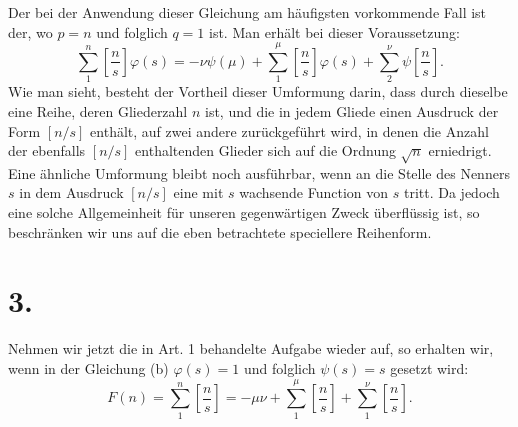 \documentclass[11pt]{article}
\newcommand{\floor}[1]{\left[#1\right]}
\begin{document}
Der bei der Anwendung dieser Gleichung am häufigsten vorkommende Fall ist der, wo $p=n$ und folglich $q=1$ ist. Man erhält bei dieser Voraussetzung:
\begin{equation}
 \sum_{1}^{n}\floor{\frac ns}\varphi(s)=
 -\nu\psi(\mu)+\sum_{1}^{\mu}\floor{\frac ns}\varphi(s)+
 \sum_{2}^{\nu}\psi\floor{\frac ns}. \tag{b}
\end{equation}
Wie man sieht, besteht der Vortheil dieser Umformung darin, dass durch dieselbe eine Reihe, deren Gliederzahl $n$ ist, und die in jedem Gliede einen Ausdruck der Form $\floor{n/s}$ enthält, auf zwei andere zurückgeführt wird, in denen die Anzahl der ebenfalls $\floor{n/s}$ enthaltenden Glieder sich auf die Ordnung $\sqrt n$ erniedrigt. Eine ähnliche Umformung bleibt noch ausführbar, wenn an die Stelle des Nenners $s$ in dem Ausdruck $\floor{n/s}$ eine mit $s$ wachsende Function von $s$ tritt. Da jedoch eine solche Allgemeinheit für unseren gegenwärtigen Zweck überflüssig ist, so beschränken wir uns auf die eben betrachtete speciellere Reihenform.

\section*{3.}

Nehmen wir jetzt die in Art. 1 behandelte Aufgabe wieder auf, so erhalten wir, wenn in der Gleichung (b) $\varphi(s)=1$ und folglich $\psi(s)=s$ gesetzt wird:
\[
 F(n)=\sum_{1}^{n}\floor{\frac ns}=-\mu\nu+
 \sum_{1}^{\mu}\floor{\frac ns}+\sum_{1}^{\nu}\floor{\frac ns}.
\]
\end{document}
